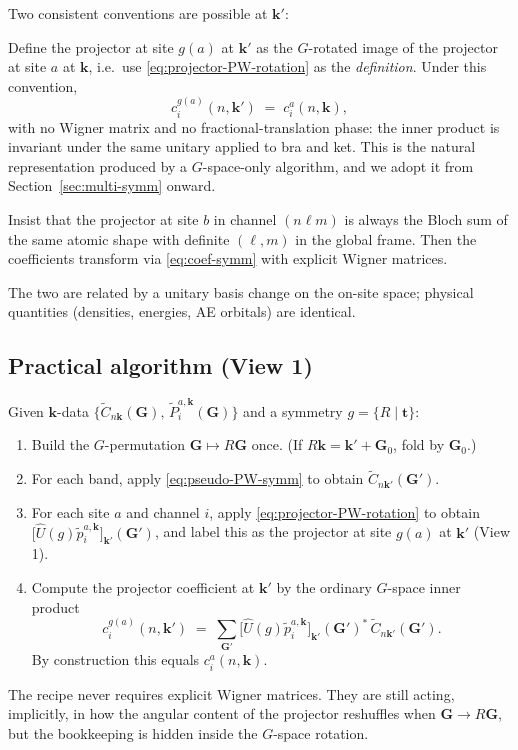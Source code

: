 \documentclass[11pt,a4paper]{article}
\newcommand{\kk}{\mathbf{k}}
\newcommand{\GG}{\mathbf{G}}
\newcommand{\tvec}{\mathbf{t}}
\newcommand{\Uhat}{\hat{U}}
\begin{document}
Two consistent conventions are possible at $\kk'$:
\begin{description}[leftmargin=2em]
\item[\textbf{View 1 (rotate everything together).}]
  Define the projector at site $g(a)$ at $\kk'$ as the
  $G$-rotated image of the projector at site $a$ at $\kk$, i.e.\
  use \eqref{eq:projector-PW-rotation} as the \emph{definition}.
  Under this convention,
  \begin{equation}
  c_i^{g(a)}(n,\kk') \;=\; c_i^{a}(n,\kk),
  \label{eq:view1-equality}
  \end{equation}
  with no Wigner matrix and no fractional-translation phase: the inner
  product is invariant under the same unitary applied to bra and ket. This is
  the natural representation produced by a $G$-space-only algorithm, and we
  adopt it from Section~\ref{sec:multi-symm} onward.
\item[\textbf{View 2 (canonical $\ell m$ basis at every $\kk$).}]
  Insist that the projector at site $b$ in channel $(n\ell m)$ is always the
  Bloch sum of the same atomic shape with definite $(\ell,m)$ in the global
  frame. Then the coefficients transform via
  \eqref{eq:coef-symm} with explicit Wigner matrices.
\end{description}
The two are related by a unitary basis change on the on-site space; physical
quantities (densities, energies, AE orbitals) are identical.

\subsection{Practical algorithm (View 1)}

Given $\kk$-data $\{\tilde C_{n\kk}(\GG),\,\tilde P_i^{a,\kk}(\GG)\}$ and a
symmetry $g = \{R\mid\tvec\}$:
\begin{enumerate}[leftmargin=*]
\item Build the $G$-permutation $\GG\mapsto R\GG$ once. (If $R\kk = \kk' +
      \GG_0$, fold by $\GG_0$.)
\item For each band, apply \eqref{eq:pseudo-PW-symm} to obtain
      $\tilde C_{n\kk'}(\GG')$.
\item For each site $a$ and channel $i$, apply
      \eqref{eq:projector-PW-rotation} to obtain
      $\bigl[\Uhat(g)\tilde p_i^{a,\kk}\bigr]_{\kk'}\!(\GG')$, and label this
      as the projector at site $g(a)$ at $\kk'$ (View 1).
\item Compute the projector coefficient at $\kk'$ by the ordinary
      $G$-space inner product
      \begin{equation}
      c_i^{g(a)}(n,\kk')
        \;=\; \sum_{\GG'} \bigl[\Uhat(g)\tilde p_i^{a,\kk}\bigr]_{\kk'}\!(\GG')^*\,
              \tilde C_{n\kk'}(\GG').
      \end{equation}
      By construction this equals $c_i^a(n,\kk)$.
\end{enumerate}
The recipe never requires explicit Wigner matrices. They are still acting,
implicitly, in how the angular content of the projector reshuffles when
$\GG\to R\GG$, but the bookkeeping is hidden inside the $G$-space rotation.
\end{document}
